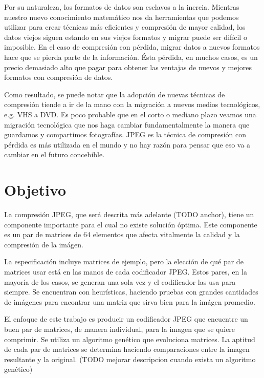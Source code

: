 Por su naturaleza, los formatos de datos son esclavos a la inercia. Mientras nuestro nuevo conocimiento matemático nos da herramientas que podemos utilizar para crear técnicas más eficientes y compresión de mayor calidad, los datos viejos siguen estando en sus viejos formatos y migrar puede ser difícil o imposible. En el caso de compresión con pérdida, migrar datos a nuevos formatos hace que se pierda parte de la información. Ésta pérdida, en muchos casos, es un precio demasiado alto que pagar para obtener las ventajas de nuevos y mejores formatos con compresión de datos.

Como resultado, se puede notar que la adopción de nuevas técnicas de compresión tiende a ir de la mano con la migración a nuevos medios tecnológicos, e.g. VHS a DVD. Es poco probable que en el corto o mediano plazo veamos una migración tecnológica que nos haga cambiar fundamentalmente la manera que guardamos y compartimos fotografías. JPEG es la técnica de compresión con pérdida es más utilizada en el mundo y no hay razón para pensar que eso va a cambiar en el futuro concebible.

\section{Objetivo}

La compresión JPEG, que será descrita más adelante (TODO anchor), tiene un componente importante para el cual no existe solución óptima. Este componente es un par de matrices de 64 elementos que afecta vitalmente la calidad y la compresión de la imágen.

La especificación incluye matrices de ejemplo, pero la elección de qué par de matrices usar está en las manos de cada codificador JPEG. Estos pares, en la mayoría de los casos, se generan una sola vez y el codificador las usa para siempre. Se encuentran con heurísticas, haciendo pruebas con grandes cantidades de imágenes para encontrar una matriz que sirva bien para la imágen promedio.

El enfoque de este trabajo es producir un codificador JPEG que encuentre un buen par de matrices, de manera individual, para la imagen que se quiere comprimir. Se utiliza un algoritmo genético que evoluciona matrices. La aptitud de cada par de matrices se determina haciendo comparaciones entre la imagen resultante y la original. (TODO mejorar descripcion cuando exista un algoritmo genético)




